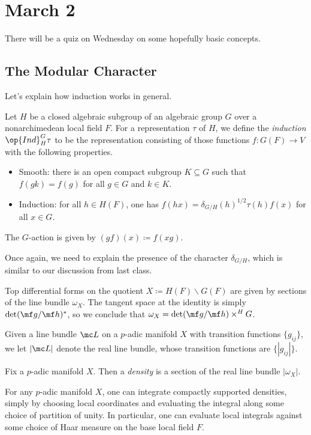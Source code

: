 \documentclass[../notes.tex]{subfiles}
\begin{document}
\section{March 2}
There will be a quiz on Wednesday on some hopefully basic concepts.

\subsection{The Modular Character}
Let's explain how induction works in general.
\begin{definition}[induction]
	Let $H$ be a closed algebraic subgroup of an algebraic group $G$ over a nonarchimedean local field $F$. For a representation $\tau$ of $H$, we define the \textit{induction} $\op{Ind}^G_H\tau$ to be the representation consisting of those functions $f\colon G(F)\to V$ with the following properties.
	\begin{itemize}
		\item Smooth: there is an open compact subgroup $K\subseteq G$ such that $f(gk)=f(g)$ for all $g\in G$ and $k\in K$.
		\item Induction: for all $h\in H(F)$, one has $f(hx)=\delta_{G/H}(h)^{1/2}\tau(h)f(x)$ for all $x\in G$.
	\end{itemize}
	The $G$-action is given by $(gf)(x)\coloneqq f(xg)$.
\end{definition}
Once again, we need to explain the presence of the character $\delta_{G/H}$, which is similar to our discussion from last class.
\begin{remark}
	Top differential forms on the quotient $X\coloneqq H(F)\backslash G(F)$ are given by sections of the line bundle $\omega_X$. The tangent space at the identity is simply $\det(\mf g/\mf h)^*$, so we conclude that $\omega_X=\det(\mf g/\mf h)\times^HG$.
\end{remark}
\begin{notation}
	Given a line bundle $\mc L$ on a $p$-adic manifold $X$ with transition functions $\{g_{ij}\}$, we let $\left|\mc L\right|$ denote the real line bundle, whose transition functions are $\{\left|g_{ij}\right|\}$.
\end{notation}
\begin{definition}[density]
	Fix a $p$-adic manifold $X$. Then a \textit{density} is a section of the real line bundle $\left|\omega_X\right|$.
\end{definition}
\begin{remark}
	For any $p$-adic manifold $X$, one can integrate compactly supported densities, simply by choosing local coordinates and evaluating the integral along some choice of partition of unity. In particular, one can evaluate local integrals against some choice of Haar measure on the base local field $F$.
\end{remark}
\end{document}
